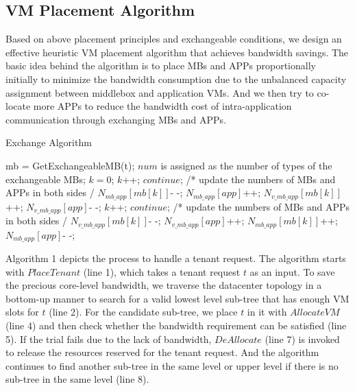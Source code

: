 \documentclass[review]{elsarticle}
\begin{document}
\subsection{VM Placement Algorithm}

Based on above placement principles and exchangeable conditions, we design an effective heuristic VM placement algorithm that achieves bandwidth savings.
The basic idea behind the algorithm is to place MBs and APPs proportionally initially to minimize the bandwidth consumption due to the unbalanced capacity assignment between middlebox and application VMs. And we then try to co-locate more APPs to reduce the bandwidth cost of intra-application communication through exchanging MBs and APPs. 




 


\begin{algorithm}[H]%
	\caption{Exchange Algorithm}
	\begin{algorithmic}[1]
		\State mb = GetExchangeableMB(t);
		\State $num$ is assigned as the number of types
		\State of the exchangeable MBs;
		\State $k = 0$;
		\State $k$++; $continue$;
		\EndIf
		\State /* update the numbers of MBs
		\State and APPs in both sides \quad \quad*/
		\State $N_{mb\_app}[mb[k]]$- -; $N_{mb\_app}[app]$++;
		\State $N_{v\_mb\_app}[mb[k]]$++; $N_{v\_mb\_app}[app]$- -;
		\EndWhile
		\Else
		\While{$k<num \quad and \quad N_{mb\_app}!=0$}
		\If {$N_{v\_mb\_app}[mb[k]]==0$}
		\State $k$++; $continue$;
		\EndIf
		\State /* update the numbers of MBs
		\State and APPs in both sides \quad \quad*/
		\State $N_{v\_mb\_app}[mb[k]]$- -; $N_{v\_mb\_app}[app]$++;
		\State $N_{mb\_app}[mb[k]]$++; $N_{mb\_app}[app]$- -;
		\EndWhile
		\EndIf
		\EndIf
		\EndFunction    
	\end{algorithmic}
	
\end{algorithm}		

Algorithm 1 depicts the process to handle a tenant request. The algorithm starts with $PlaceTenant$ (line 1), which takes a tenant request $t$ as an input. To save the precious core-level bandwidth, we traverse the datacenter topology in a bottom-up manner to search for a valid lowest level sub-tree that has enough VM slots for $t$ (line 2). For the candidate sub-tree, we place $t$ in it with $AllocateVM$ (line 4) and then check whether the bandwidth requirement can be satisfied (line 5). If the trial fails due to the lack of bandwidth, $DeAllocate$ (line 7) is invoked to release the resources reserved for the tenant request. And the algorithm continues to find another sub-tree in the same level or upper level if there is no sub-tree in the same level (line 8). 
\end{document}
